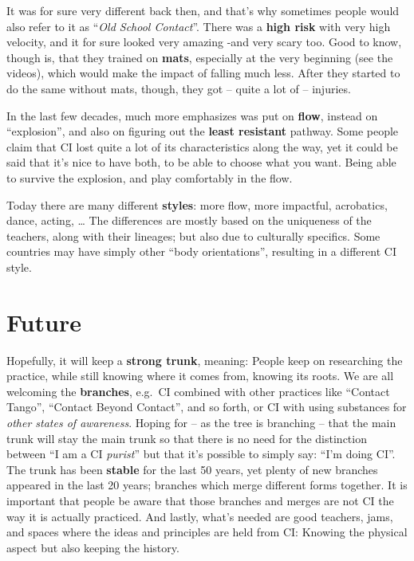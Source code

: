 It was for sure very different back then, and that's why sometimes people would also refer to it as ``\textit{Old School Contact}''.
There was a \textbf{high risk} with very high velocity, and it for sure looked very amazing -and very scary too.
Good to know, though is, that they trained on \textbf{mats}, especially at the very beginning (see the videos), which would make the impact of falling much less.
After they started to do the same without mats, though, they got -- quite a lot of -- injuries.

In the last few decades, much more emphasizes was put on \textbf{flow}, instead on ``explosion'', and also on figuring out the \textbf{least resistant} pathway.
Some people claim that CI lost quite a lot of its characteristics along the way, yet it could be said that it's nice to have both, to be able to choose what you want.
Being able to survive the explosion, and play comfortably in the flow.

Today there are many different \textbf{styles}: more flow, more impactful, acrobatics, dance, acting, \ldots
The differences are mostly based on the uniqueness of the teachers, along with their lineages; but also due to culturally specifics.
Some countries may have simply other ``body orientations'', resulting in a different CI style.

\section{Future}\label{sec:future}

Hopefully, it will keep a \textbf{strong trunk}, meaning: People keep on researching the practice, while still knowing where it comes from, knowing its roots.
We are all welcoming the \textbf{branches}, e.g.\ CI combined with other practices like ``Contact Tango'', ``Contact Beyond Contact'', and so forth, or CI with using substances for \textit{other states of awareness}.
Hoping for -- as the tree is branching -- that the main trunk will stay the main trunk so that there is no need for the distinction between ``I am a CI \textit{purist}'' but that it's possible to simply say: ``I'm doing CI''.
The trunk has been \textbf{stable} for the last 50 years, yet plenty of new branches appeared in the last 20 years; branches which merge different forms together.
It is important that people be aware that those branches and merges are not CI the way it is actually practiced.
And lastly, what's needed are good teachers, jams, and spaces where the ideas and principles are held from CI: Knowing the physical aspect but also keeping the history.

